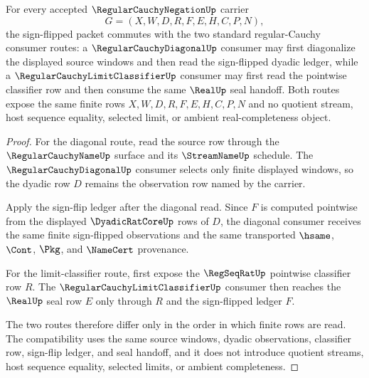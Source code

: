 \begin{theorem}
\label{thm:regular-cauchy-negation-diagonal-compatibility}
For every accepted $\RegularCauchyNegationUp$ carrier
$$
G=(X,W,D,R,F,E,H,C,P,N),
$$
the sign-flipped packet commutes with the two standard regular-Cauchy consumer routes: a $\RegularCauchyDiagonalUp$ consumer may first diagonalize the displayed source windows and then read the sign-flipped dyadic ledger, while a $\RegularCauchyLimitClassifierUp$ consumer may first read the pointwise classifier row and then consume the same $\RealUp$ seal handoff. Both routes expose the same finite rows $X,W,D,R,F,E,H,C,P,N$ and no quotient stream, host sequence equality, selected limit, or ambient real-completeness object.
\end{theorem}
\begin{proof}
For the diagonal route, read the source row through the $\RegularCauchyNameUp$ surface and its $\StreamNameUp$ schedule. The $\RegularCauchyDiagonalUp$ consumer selects only finite displayed windows, so the dyadic row $D$ remains the observation row named by the carrier.

Apply the sign-flip ledger after the diagonal read. Since $F$ is computed pointwise from the displayed $\DyadicRatCoreUp$ rows of $D$, the diagonal consumer receives the same finite sign-flipped observations and the same transported $\hsame$, $\Cont$, $\Pkg$, and $\NameCert$ provenance.

For the limit-classifier route, first expose the $\RegSeqRatUp$ pointwise classifier row $R$. The $\RegularCauchyLimitClassifierUp$ consumer then reaches the $\RealUp$ seal row $E$ only through $R$ and the sign-flipped ledger $F$.

The two routes therefore differ only in the order in which finite rows are read. The compatibility uses the same source windows, dyadic observations, classifier row, sign-flip ledger, and seal handoff, and it does not introduce quotient streams, host sequence equality, selected limits, or ambient completeness.
\end{proof}

